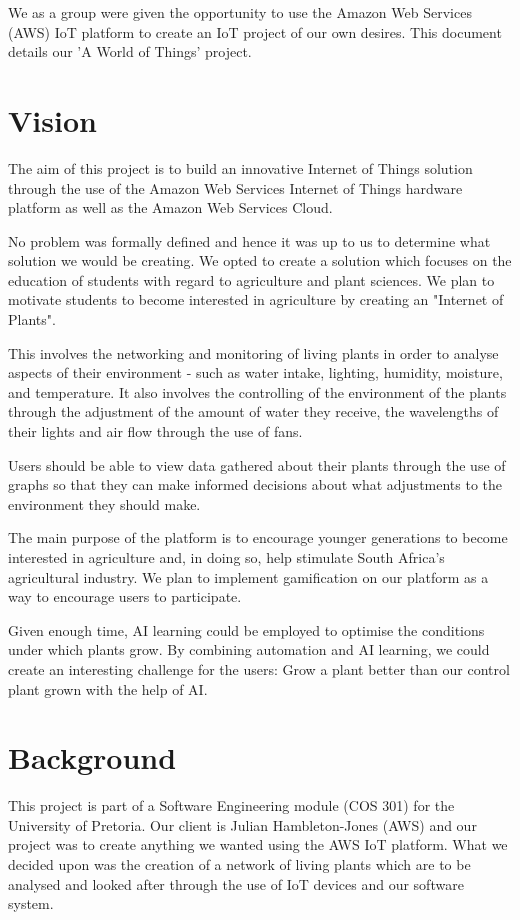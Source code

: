 \documentclass{article}
\begin{document}
	We as a group were given the opportunity to use the Amazon Web Services (AWS) IoT platform to create an IoT project of our own desires. This document details our 'A World of Things' project.

\section{Vision}
	The aim of this project is to build an innovative Internet of Things solution through the use of the Amazon Web Services Internet of Things hardware platform as well as the Amazon Web Services Cloud.
	
	No problem was formally defined and hence it was up to us to determine what solution we would be creating. We opted to create a solution which focuses on the education of students with regard to agriculture and plant sciences. We plan to motivate students to become interested in agriculture by creating an "Internet of Plants".
	
	This involves the networking and monitoring of living plants in order to analyse aspects of their environment - such as water intake, lighting, humidity, moisture, and temperature. It also involves the controlling of the environment of the plants through the adjustment of the amount of water they receive, the wavelengths of their lights and air flow through the use of fans.
	
	Users should be able to view data gathered about their plants through the use of graphs so that they can make informed decisions about what adjustments to the environment they should make.
	
	The main purpose of the platform is to encourage younger generations to become interested in agriculture and, in doing so, help stimulate South Africa's agricultural industry. We plan to implement gamification on our platform as a way to encourage users to participate.
	
	Given enough time, AI learning could be employed to optimise the conditions under which plants grow. By combining automation and AI learning, we could create an interesting challenge for the users: Grow a plant better than our control plant grown with the help of AI.

\section{Background}
	This project is part of a Software Engineering module (COS 301) for the University of Pretoria. Our client is Julian Hambleton-Jones (AWS) and our project was to create anything we wanted using the AWS IoT platform. What we decided upon was the creation of a network of living plants which are to be analysed and looked after through the use of IoT devices and our software system.
	
\end{document}
